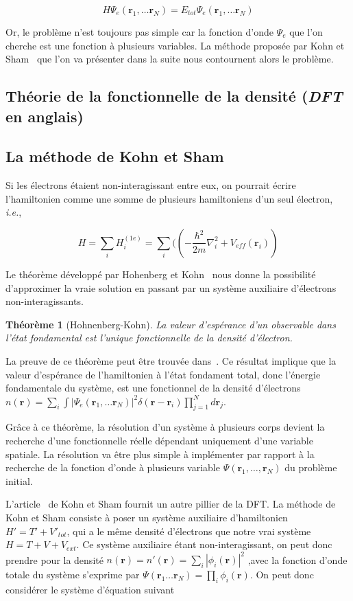 \documentclass[12pt, french]{report}
\theoremstyle{theoreme}
\newtheorem{theoreme}{Théorème}
\begin{document}
$$
H \Psi_e(\textbf{r}_1, \ldots \textbf{r}_N) = E_{tot} \Psi_e(\textbf{r}_1, \ldots \textbf{r}_N)
$$

Or, le problème n'est toujours pas simple car la fonction d'onde $\Psi_e$ que l'on cherche est une fonction à plusieurs variables. La méthode proposée par Kohn et Sham~\cite{Koh65} que l'on va présenter dans la suite nous contournent alors le problème.

\subsection{Théorie de la fonctionnelle de la densité (\textit{DFT} en anglais)}
\subsection{La méthode de Kohn et Sham}
\label{subsec-KS}
Si les électrons étaient non-interagissant entre eux, on pourrait écrire l'hamiltonien comme une somme de plusieurs hamiltoniens d'un seul électron, \textit{i.e.},

$$
H = \sum_i H_i^{(1e)} = \sum_i ((-\frac{\hbar^2}{2m}\nabla_i^2 + V_{eff}(\textbf{r}_i))
$$

Le théorème développé par Hohenberg et Kohn~\cite{Hoh64} nous donne la possibilité d'approximer la vraie solution en passant par un système auxiliaire d'électrons non-interagissants.

\begin{theoreme}[Hohnenberg-Kohn]
  La valeur d'espérance d'un observable dans l'état fondamental est l'unique fonctionnelle de la densité d'électron.
\end{theoreme}

La preuve de ce théorème peut être trouvée dans~\cite{Hoh64}.
Ce résultat implique que la valeur d'espérance de l'hamiltonien à l'état fondament total, donc l'énergie fondamentale du système, est une fonctionnel de la densité d'électrons $n(\textbf{r}) = \sum_i \int |\Psi_e(\textbf{r}_1, \ldots \textbf{r}_N) |^2 \delta (\textbf{r} - \textbf{r}_i) \prod_{j=1}^N d\textbf{r}_j$.

Grâce à ce théorème, la résolution d'un système à plusieurs corps devient la recherche d'une fonctionnelle réelle dépendant uniquement d'une variable spatiale. La résolution va être plus simple à implémenter par rapport à la recherche de la fonction d'onde à plusieurs variable $\Psi (\textbf{r}_1, \ldots, \textbf{r}_N)$ du problème initial.

L'article~\cite{Koh65} de Kohn et Sham fournit un autre pillier de la DFT. La méthode de Kohn et Sham consiste à poser un système auxiliaire d'hamiltonien $H' = T' + V'_{tot}$, qui a le même densité d'électrons que notre vrai système $H = T + V + V_{ext}$. Ce système auxiliaire étant non-interagissant, on peut donc prendre pour la densité $n(\textbf{r}) = n'(\textbf{r}) = \sum_i |\phi_i(\textbf{r})|^2$ ,avec la fonction d'onde totale du système s'exprime par $\Psi(\textbf{r}_1 \ldots \textbf{r}_N) = \prod_i \phi_i(\textbf{r})$. On peut donc considérer le système d'équation suivant
\end{document}
